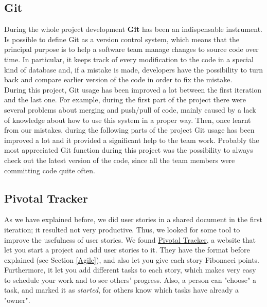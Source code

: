 	\subsection{Git}
	\vspace{-5mm}
During the whole project development \textbf{Git} has been an indispensable instrument.\\
Is possible to define Git as a version control system, which means that the principal purpose is to help a software team manage changes to source code over time. In particular, it keeps track of every modification to the code in a special kind of database and, if a mistake is made, developers have the possibility to turn back and compare earlier version of the code in order to fix the mistake.\cite{versionController}\\
During this project, Git usage has been improved a lot between the first iteration and the last one. For example, during the first part of the project there were several problems about merging and push/pull of code, mainly caused by a lack of knowledge about how to use this system in a proper way. Then, once learnt from our mistakes, during the following parts of the project Git usage has been improved a lot and it provided a significant help to the team work. Probably the most appreciated Git function during this project was the possibility to always check out the latest version of the code, since all the team members were committing code quite often.

	\subsection{Pivotal Tracker} \label{Pivotal_Tracker}
	\vspace{-5mm}
As we have explained before, we did user stories in a shared document in the first iteration; it resulted not very productive. Thus, we looked for some tool to improve the usefulness of user stories. We found \href{https://www.pivotaltracker.com/}{Pivotal Tracker}, a website that let you start a project and add user stories to it. They have the format before explained (see Section \ref{Agile}), and also let you give each story Fibonacci points. Furthermore, it let you add different tasks to each story, which makes very easy to schedule your work and to see others' progress. Also, a person can "choose" a task, and marked it as \textit{started}, for others know which tasks have already a "owner".
